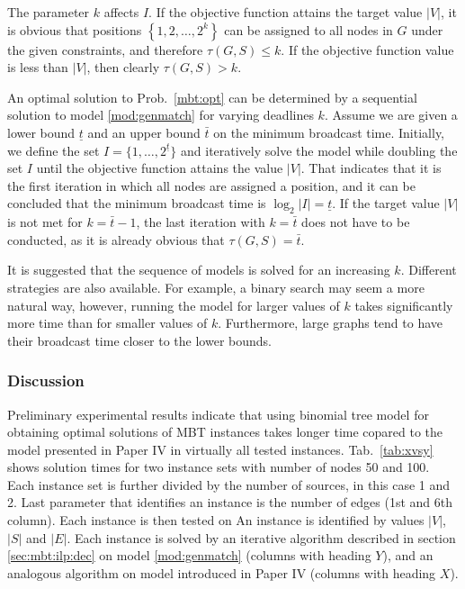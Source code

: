 The parameter $k$ affects $I$.
If the objective function attains the target value $|V|$, 
it is obvious that positions $\left\{1,2,\dots,2^k\right\}$ can be assigned to all nodes in $G$ under the given constraints, and therefore $\tau(G,S)\leq k$.
If the objective function value is less than $|V|$, then clearly $\tau(G,S)>k$.

An optimal solution to Prob.~\ref{mbt:opt} can be determined by a sequential solution to model \eqref{mod:genmatch} for varying deadlines $k$.
Assume we are given a lower bound $\underline{t}$ and an upper bound $\bar{t}$ on the minimum broadcast time.
Initially, we define the set $I=\{1,\dots,2^{\underline{t}}\}$ and iteratively solve the model while doubling the set $I$ until the objective function attains the value $|V|$.
That indicates that it is the first iteration in which all nodes are assigned a position, and it can be concluded that the minimum broadcast time is $\log_2|I|=\underline{t}$.
If the target value $|V|$ is not met for $k=\bar{t}-1$, the last iteration with $k=\bar{t}$ does not have to be conducted, as it is already obvious that $\tau(G,S)=\bar{t}$.

It is suggested that the sequence of models is solved for an increasing $k$. 
Different strategies are also available. 
For example, a binary search may seem a more natural way, however, running the model for larger values of $k$ takes significantly more time than for smaller values of $k$.
Furthermore, large graphs tend to have their broadcast time closer to the lower bounds.

\subsubsection{Discussion}

Preliminary experimental results indicate that using binomial tree model for obtaining optimal solutions of MBT instances 
takes longer time copared to the model presented in Paper IV in virtually all tested instances. 
Tab.~\ref{tab:xvsy} shows solution times for two instance sets with number of nodes 50 and 100.
Each instance set is further divided by the number of sources, in this case 1 and 2.
Last parameter that identifies an instance is the number of edges (1st and 6th column).
Each instance is then tested on 
An instance is identified by values $|V|$, $|S|$ and $|E|$.
Each instance is solved by an iterative algorithm described in section \ref{sec:mbt:ilp:dec} on model \eqref{mod:genmatch}
(columns with heading $Y$), and an analogous algorithm on model introduced in Paper IV (columns with heading $X$).

